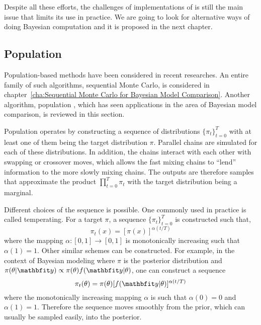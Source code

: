 Despite all these efforts, the challenges of implementations of \rjmcmc is
still the main issue that limits its use in practice. We are going to look for
alternative ways of doing Bayesian computation and it is proposed in the next
chapter.

\subsection{Population \protect\mcmc}
\label{sub:Population mcmc}

Population-based methods have been considered in recent researches. An entire
family of such algorithms, sequential Monte Carlo, is considered in
chapter~\ref{cha:Sequential Monte Carlo for Bayesian Model Comparison}.
Another algorithm, population \mcmc, which has seen applications in the area of
Bayesian model comparison, is reviewed in this section.

Population \mcmc operates by constructing a sequence of distributions
$\{\pi_t\}_{t=0}^T$ with at least one of them being the target distribution
$\pi$. Parallel \mcmc chains are simulated for each of these distributions. In
addition, the chains interact with each other with swapping or crossover
moves, which allows the fast mixing chains to ``lend'' information to the more
slowly mixing chains. The outputs are therefore samples that approximate the
product $\prod_{t=0}^T\pi_t$ with the target distribution being a marginal.

Different choices of the sequence is possible. One commonly used in practice
is called temperating. For a target $\pi$, a sequence $\{\pi_t\}_{t=0}^T$ is
constructed such that,
\begin{equation}
  \pi_t(x) = [\pi(x)]^{\alpha(t/T)}
\end{equation}
where the mapping $\alpha:[0,1]\to[0,1]$ is monotonically increasing such that
$\alpha(1) = 1$. Other similar schemes can be constructed. For example, in the
context of Bayesian modeling where $\pi$ is the posterior distribution and
$\pi(\theta|\data) \propto \pi(\theta)f(\data|\theta)$, one can construct a
sequence
\begin{equation}
  \pi_t(\theta) = \pi(\theta)[f(\data|\theta)]^{\alpha(t/T)}
  \label{eq:power post}
\end{equation}
where the monotonically increasing mapping $\alpha$ is such that $\alpha(0) =
0$ and $\alpha(1) = 1$. Therefore the sequence moves smoothly from the prior,
which can usually be sampled easily, into the posterior.

